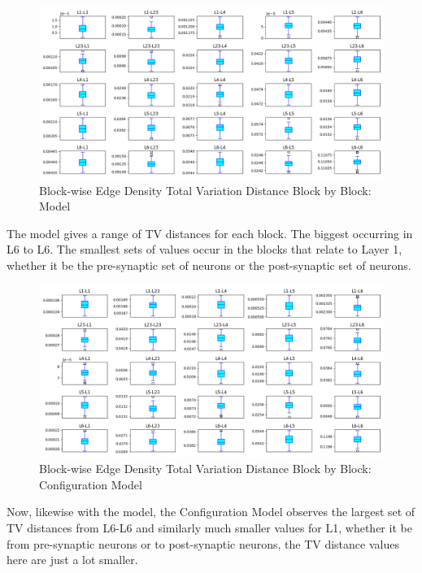 \begin{figure}[H]
\begin{center}
\captionsetup{justification=centering}
\includegraphics[width=12cm]{results_imgs/er_bed.png}
\caption{Block-wise Edge Density Total Variation Distance Block by Block: \ER Model}
\end{center}
\end{figure}
The \ER model gives a range of TV distances for each block. The biggest occurring in L6 to L6. The smallest sets of values occur in the blocks that relate to Layer 1, whether it be the pre-synaptic set of neurons or the post-synaptic set of neurons.
\begin{figure}[H]
\begin{center}
\captionsetup{justification=centering}
\includegraphics[width=12cm]{results_imgs/conf_bed.png}
\caption{Block-wise Edge Density Total Variation Distance Block by Block: Configuration Model}
\end{center}
\end{figure}
Now, likewise with the \ER model, the Configuration Model observes the largest set of TV distances from L6-L6 and similarly much smaller values for L1, whether it be from pre-synaptic neurons or to post-synaptic neurons, the TV distance values here are just a lot smaller. 

